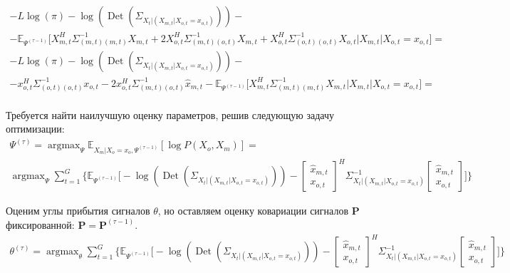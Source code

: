 \documentclass[11pt]{article}
\newcommand{\Expect}{\mathbb{E}}
\DeclareMathOperator*{\argmax}{argmax}
\DeclareMathOperator{\Det}{Det}
\begin{document}
\begin{equation*}
\begin{gathered}
-L \log(\pi) - \log (\Det(\Sigma_{X_t|(X_{m,t}|X_{o,t}=x_{o,t})}))  - \\ 
- \Expect_{\Psi^{(\tau-1)}}\bigg[X_{m,t}^H \Sigma_{(m,t)(m,t)}^{-1}X_{m,t} + 2 X_{o,t}^H \Sigma_{(m,t)(o,t)}^{-1}X_{m,t}  + X_{o,t}^H \Sigma_{(o,t)(o,t)}^{-1}X_{o,t}\Big|X_{m,t}|X_{o,t}=x_{o,t}\bigg] = \\
-L \log(\pi) - \log (\Det(\Sigma_{X_t|(X_{m,t}|X_{o,t}=x_{o,t})}))  - \\ 
- x_{o,t}^H \Sigma_{(o,t)(o,t)}^{-1}x_{o,t} - 2 x_{o,t}^H \Sigma_{(m,t)(o,t)}^{-1}\hat{x}_{m,t} - \Expect_{\Psi^{(\tau-1)}}\bigg[X_{m,t}^H \Sigma_{(m,t)(m,t)}^{-1}X_{m,t}   \Big|X_{m,t}|X_{o,t}=x_{o,t}\bigg] = \\
\end{gathered}
\end{equation*}
\begin{center}
\fontsize{14}{18}\selectfont {}
\end{center}
Требуется найти наилучшую оценку параметров, решив следующую задачу оптимизации:
\begin{equation*}
\begin{gathered}
\Psi^{(\tau)}=\argmax_{\Psi} \Expect_{X_m|X_o=x_o, \Psi^{(\tau-1)}}[\log P(X_o, X_m)] =\\
\argmax_{\Psi} \sum_{t=1}^G \bigg \{   \Expect_{\Psi^{(\tau-1)}}\bigg[- \log (\Det(\Sigma_{X_t|(X_{m,t}|X_{o,t}=x_{o,t})})) - 
\begin{bmatrix} \hat{x}_{m,t} \\  x_{o,t} \end{bmatrix}^H \Sigma_{X_t|(X_{m,t}|X_{o,t}=x_{o,t})}^{-1}
\begin{bmatrix} \hat{x}_{m,t} \\  x_{o,t} \end{bmatrix}\bigg] \bigg\}
\end{gathered}
\end{equation*}
\begin{center}
\fontsize{14}{18}\selectfont {}
\end{center}
Оценим углы прибытия сигналов $\theta$, но оставляем оценку ковариации сигналов $\mathbf{P}$ фиксированной: $\mathbf{P} = \mathbf{P}^{(\tau-1)}$.
\begin{equation*}
\begin{gathered}
\theta^{(\tau)}=\argmax_{\theta} \sum_{t=1}^G \bigg \{   \Expect_{\Psi^{(\tau-1)}}\bigg[- \log (\Det(\Sigma_{X_t|(X_{m,t}|X_{o,t}=x_{o,t})})) - 
\begin{bmatrix} \hat{x}_{m,t} \\  x_{o,t} \end{bmatrix}^H \Sigma_{X_t|(X_{m,t}|X_{o,t}=x_{o,t})}^{-1}
\begin{bmatrix} \hat{x}_{m,t} \\  x_{o,t} \end{bmatrix}\bigg] \bigg\}
\end{gathered}
\end{equation*}
\end{document}
